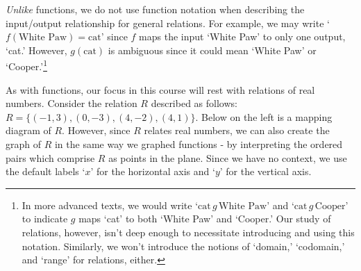 \documentclass{ximera}
\begin{document}
\smallskip

\textit{Unlike} functions, we do not use function notation when describing the input/output relationship for general relations.  For example, we may write `$f(\text{White Paw}) = \text{cat}$'  since $f$ maps the input `White Paw' to only one output, `cat.'  However, $g(\text{cat})$ is ambiguous since it could mean `White Paw' or `Cooper.'\footnote{In more advanced texts, we would write `$\text{cat} \, g \, \text{White Paw}$' and `$\text{cat} \,  g \, \text{Cooper}$' to indicate $g$ maps `cat' to both `White Paw' and `Cooper.'  Our study of relations, however, isn't deep enough to necessitate introducing and using this notation.  Similarly, we won't introduce the notions of `domain,' `codomain,' and `range' for relations, either.}

\smallskip

As with functions, our focus in this course will rest with relations of real numbers.  Consider the relation $R$ described as follows:  $R = \{ (-1,3), (0,-3), (4,-2), (4,1) \}$.  Below on the left is a mapping diagram of $R$.  However, since $R$ relates real numbers, we can also create the graph of $R$ in the same way we graphed functions - by interpreting the ordered pairs which comprise $R$ as points in the plane.  Since we have no context, we use the default labels `$x$' for the horizontal axis and `$y$' for the vertical axis.
\end{document}

